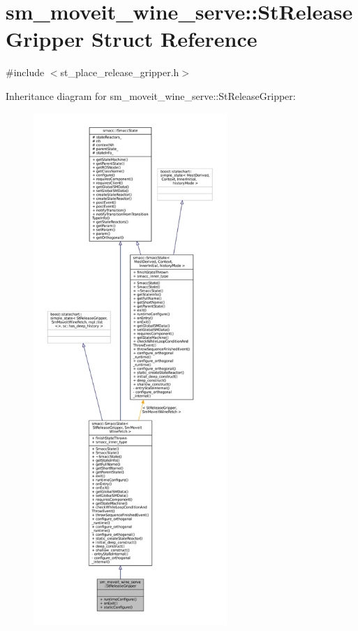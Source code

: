 \hypertarget{structsm__moveit__wine__serve_1_1StReleaseGripper}{}\section{sm\+\_\+moveit\+\_\+wine\+\_\+serve\+:\+:St\+Release\+Gripper Struct Reference}
\label{structsm__moveit__wine__serve_1_1StReleaseGripper}


{\ttfamily \#include $<$st\+\_\+place\+\_\+release\+\_\+gripper.\+h$>$}



Inheritance diagram for sm\+\_\+moveit\+\_\+wine\+\_\+serve\+:\+:St\+Release\+Gripper\+:
\nopagebreak
\begin{figure}[H]
\begin{center}
\leavevmode
\includegraphics[height=550pt]{structsm__moveit__wine__serve_1_1StReleaseGripper__inherit__graph}
\end{center}
\end{figure}


